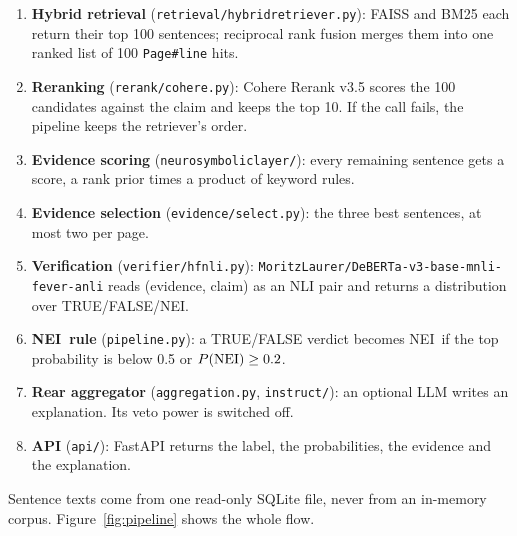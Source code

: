 \documentclass[11pt,a4paper]{article}
\makeatletter
\DeclareRobustCommand{\_}{\ifmmode\nfss@text{\textunderscore}\else\textunderscore\allowbreak\fi}
\newcommand{\file}[1]{\texttt{#1}}
\newcommand{\NEI}{\textup{NEI}}
\makeatother
\begin{document}
\begin{enumerate}
  \item \textbf{Hybrid retrieval} (\file{retrieval/hybrid\_retriever.py}): FAISS and BM25 each return their top 100
        sentences; reciprocal rank fusion merges them into one ranked list of 100 \texttt{Page\#line} hits.
  \item \textbf{Reranking} (\file{rerank/cohere.py}): Cohere Rerank v3.5 scores the 100 candidates against the claim
        and keeps the top 10. If the call fails, the pipeline keeps the retriever's order.
  \item \textbf{Evidence scoring} (\file{neurosymbolic\_layer/}): every remaining sentence gets a score, a rank prior
        times a product of keyword rules.
  \item \textbf{Evidence selection} (\file{evidence/select.py}): the three best sentences, at most two per page.
  \item \textbf{Verification} (\file{verifier/hf\_nli.py}): \texttt{MoritzLaurer/\allowbreak DeBERTa-v3-base-\allowbreak mnli-fever-anli}
        reads (evidence, claim) as an NLI pair and returns a distribution over TRUE/FALSE/\NEI.
  \item \textbf{\NEI\ rule} (\file{pipeline.py}): a TRUE/FALSE verdict becomes \NEI\ if the top probability is below 0.5
        or $P(\NEI)\ge 0.2$.
  \item \textbf{Rear aggregator} (\file{aggregation.py}, \file{instruct/}): an optional LLM writes an explanation.
        Its veto power is switched off.
  \item \textbf{API} (\file{api/}): FastAPI returns the label, the probabilities, the evidence and the explanation.
\end{enumerate}

Sentence texts come from one read-only SQLite file, never from an in-memory corpus. Figure~\ref{fig:pipeline} shows the whole flow.
\end{document}
